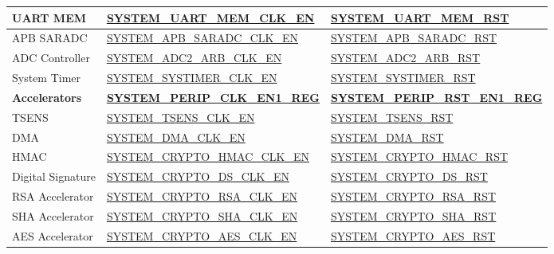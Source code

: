 \documentclass[main\_\_EN.tex]{subfiles}
\begin{document}
\begin{ThreePartTable}
\begin{longtable}[c]{ |l|l|l| }
    UART MEM    & \hyperref[fielddesc:SYSTEMUARTMEMCLKEN]{SYSTEM\_UART\_MEM\_CLK\_EN} \tnote{4} & \hyperref[fielddesc:SYSTEMUARTMEMRST]{SYSTEM\_UART\_MEM\_RST} \\\hline
    APB SARADC    & \hyperref[fielddesc:SYSTEMAPBSARADCCLKEN]{SYSTEM\_APB\_SARADC\_CLK\_EN} & \hyperref[fielddesc:SYSTEMAPBSARADCRST]{SYSTEM\_APB\_SARADC\_RST} \\\hline
    ADC Controller    & \hyperref[fielddesc:SYSTEMADC2ARBCLKEN]{SYSTEM\_ADC2\_ARB\_CLK\_EN} & \hyperref[fielddesc:SYSTEMADC2ARBRST]{SYSTEM\_ADC2\_ARB\_RST} \\\hline
    System Timer    & \hyperref[fielddesc:SYSTEMSYSTIMERCLKEN]{SYSTEM\_SYSTIMER\_CLK\_EN} & \hyperref[fielddesc:SYSTEMSYSTIMERRST]{SYSTEM\_SYSTIMER\_RST} \\\hline

    \textbf{Accelerators} & \textbf{\hyperref[regdesc:SYSTEMPERIPCLKEN1REG]{SYSTEM\_PERIP\_CLK\_EN1\_REG}} & \textbf{\hyperref[regdesc:SYSTEMPERIPRSTEN1REG]{SYSTEM\_PERIP\_RST\_EN1\_REG}} \\ \hline

    TSENS & \hyperref[fielddesc:SYSTEMTSENSCLKEN]{SYSTEM\_TSENS\_CLK\_EN} & \hyperref[fielddesc:SYSTEMTSENSRST]{SYSTEM\_TSENS\_RST} \\\hline
    DMA & \hyperref[fielddesc:SYSTEMDMACLKEN]{SYSTEM\_DMA\_CLK\_EN} & \hyperref[fielddesc:SYSTEMDMARST]{SYSTEM\_DMA\_RST}\tnote{5}  \\\hline
    HMAC & \hyperref[fielddesc:SYSTEMCRYPTOHMACCLKEN]{SYSTEM\_CRYPTO\_HMAC\_CLK\_EN} & \hyperref[fielddesc:SYSTEMCRYPTOHMACRST]{SYSTEM\_CRYPTO\_HMAC\_RST} \tnote{6} \\\hline
    Digital Signature & \hyperref[fielddesc:SYSTEMCRYPTODSCLKEN]{SYSTEM\_CRYPTO\_DS\_CLK\_EN} & \hyperref[fielddesc:SYSTEMCRYPTODSRST]{SYSTEM\_CRYPTO\_DS\_RST} \tnote{7} \\\hline
    RSA Accelerator & \hyperref[fielddesc:SYSTEMCRYPTORSACLKEN]{SYSTEM\_CRYPTO\_RSA\_CLK\_EN} & \hyperref[fielddesc:SYSTEMCRYPTORSARST]{SYSTEM\_CRYPTO\_RSA\_RST} \\\hline
    SHA Accelerator & \hyperref[fielddesc:SYSTEMCRYPTOSHACLKEN]{SYSTEM\_CRYPTO\_SHA\_CLK\_EN} & \hyperref[fielddesc:SYSTEMCRYPTOSHARST]{SYSTEM\_CRYPTO\_SHA\_RST} \\\hline
    AES Accelerator & \hyperref[fielddesc:SYSTEMCRYPTOAESCLKEN]{SYSTEM\_CRYPTO\_AES\_CLK\_EN} & \hyperref[fielddesc:SYSTEMCRYPTOAESRST]{SYSTEM\_CRYPTO\_AES\_RST} \\\hline

\end{longtable}
\end{ThreePartTable}
\end{document}
